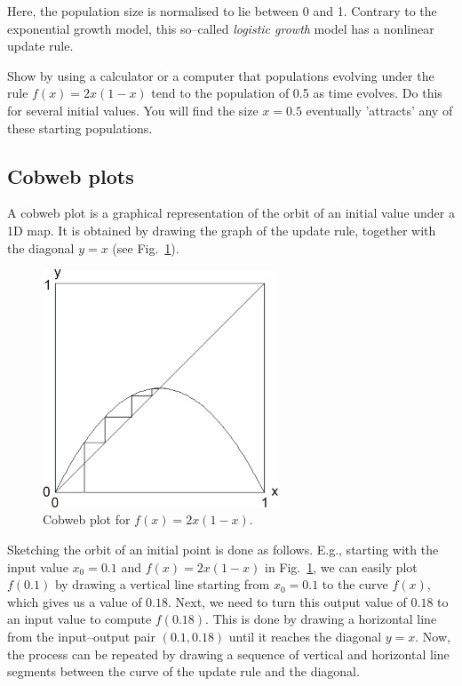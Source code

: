 Here, the population size is normalised to lie between 0 and 1. Contrary to the exponential growth model, this so--called \emph{logistic growth} model has a nonlinear update rule.

\begin{sidebar}
\begin{ex}
Show by using a calculator or a computer that populations evolving under the rule $f(x) = 2 x (1-x)$ tend to the population of 0.5 as time evolves. Do this for several initial values. You will find the size $x=0.5$ eventually 'attracts' any of these starting populations.
\end{ex}
\end{sidebar}

\subsection{Cobweb plots}

A cobweb plot is a graphical representation of the orbit of an initial value under a 1D map. It is obtained by drawing the graph of the update rule, together with the diagonal $y=x$ (see Fig.~\ref{fig-cobweb1}).

\begin{figure}
\centering
\includegraphics[width=7cm]{dynamic/figures/cobweb1}
\caption{Cobweb plot for $f(x)=2x(1-x)$.}
\label{fig-cobweb1}
\end{figure} 

Sketching the orbit of an initial point is done as follows. E.g., starting with the input value $x_0=0.1$ and $f(x)=2x(1-x)$ in Fig.~\ref{fig-cobweb1}, we can easily plot $f(0.1)$ by drawing a vertical line starting from $x_0=0.1$ to the curve $f(x)$, which gives us a value of $0.18$. Next, we need to turn this output value of $0.18$ to an input value to compute $f(0.18)$. This is done by drawing a horizontal line from the input--output pair $(0.1,0.18)$ until it reaches the diagonal $y=x$. Now, the process can be repeated by drawing a sequence of vertical and horizontal line segments between the curve of the update rule and the diagonal.

